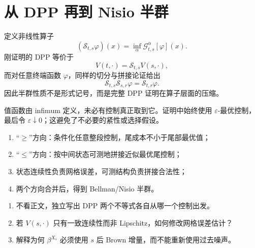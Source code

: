 \section{从 DPP 再到 Nisio 半群}

定义非线性算子
\[
(\mathcal S_{t,s}\varphi)(x)
=\inf_{\alpha}\mathcal G_{t,s}^{\alpha}[\varphi](x).
\]
刚证明的 DPP 等价于
\[
V(t,\cdot)=\mathcal S_{t,s}V(s,\cdot),
\]
而对任意终端函数 $\varphi$，同样的切分与拼接论证给出
\[
\mathcal S_{t,s}\mathcal S_{s,r}\varphi
=\mathcal S_{t,r}\varphi.
\]
因此半群性质不是形式记号，而是完整 DPP 证明在算子层面的压缩。

\begin{pitfall}
值函数由 infimum 定义，未必有控制真正取到它。证明中始终使用 $\varepsilon$-最优控制，最后令 $\varepsilon\downarrow0$；这避免了不必要的紧性或选择假设。
\end{pitfall}

\begin{takeaway}
\begin{enumerate}
  \item “$\ge$”方向：条件化任意整段控制，尾成本不小于尾部最优值；
  \item “$\le$”方向：按中间状态可测地拼接近似最优尾控制；
  \item 状态连续性负责网格误差，可测结构负责拼接合法性；
  \item 两个方向合并后，得到 Bellman/Nisio 半群。
\end{enumerate}
\end{takeaway}

\begin{exercisebox}
\begin{enumerate}
  \item 不看正文，独立写出 DPP 两个不等式各自从哪一个控制出发。
  \item 若 $V(s,\cdot)$ 只有一致连续性而非 Lipschitz，如何修改网格误差估计？
  \item 解释为何 $\beta^{X_s}$ 必须使用 $s$ 后 Brown 增量，而不能重新使用过去噪声。
\end{enumerate}
\end{exercisebox}

